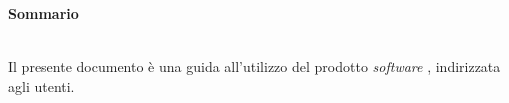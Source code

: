 \noindent\begin{Large}\textbf{Sommario}\end{Large}\\
\noindent Il presente documento è una guida all'utilizzo del prodotto \textit{software} \progetto{}, indirizzata agli utenti.


